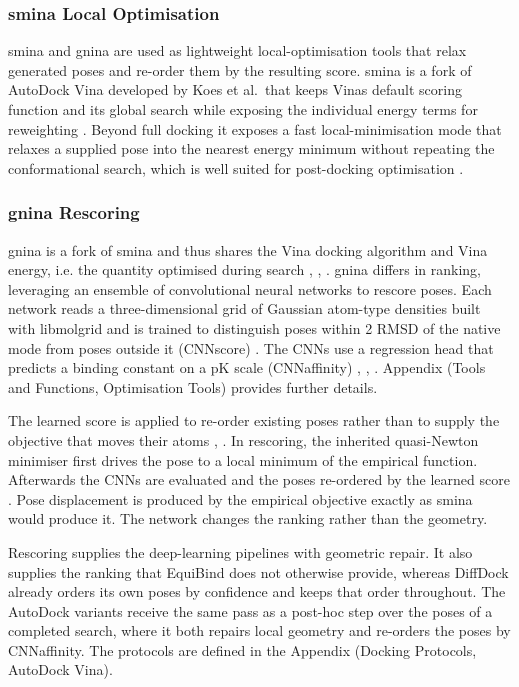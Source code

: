 \hypertarget{smina}{%
\subsubsection{smina Local Optimisation}\label{smina}}

smina and gnina are used as lightweight local-optimisation tools that relax generated poses and re-order them by the resulting score. smina is a fork of AutoDock Vina developed by Koes et al.\ that keeps Vina\textquotesingle s default scoring function and its global search while exposing the individual energy terms for reweighting \cite{ref055}. Beyond full docking it exposes a fast local-minimisation mode that relaxes a supplied pose into the nearest energy minimum without repeating the conformational search, which is well suited for post-docking optimisation \cite{ref057}.

\hypertarget{gnina}{%
\subsubsection{gnina Rescoring}\label{gnina}}

gnina is a fork of smina and thus shares the Vina docking algorithm and Vina energy, i.e. the quantity optimised during search \cite{ref056}, \cite{ref067}, \cite{ref068}. gnina differs in ranking, leveraging an ensemble of convolutional neural networks to rescore poses. Each network reads a three-dimensional grid of Gaussian atom-type densities built with libmolgrid \cite{ref076} and is trained to distinguish poses within 2\angstrom{} RMSD of the native mode from poses outside it (CNNscore) \cite{ref075}. The CNNs use a regression head that predicts a binding constant on a pK scale (CNNaffinity) \cite{ref059}, \cite{ref056}, \cite{ref067}. Appendix (Tools and Functions, Optimisation Tools) provides further details.

The learned score is applied to re-order existing poses rather than to supply the objective that moves their atoms \cite{ref056}, \cite{ref058}. In rescoring, the inherited quasi-Newton minimiser first drives the pose to a local minimum of the empirical function. Afterwards the CNNs are evaluated and the poses re-ordered by the learned score \cite{ref056}. Pose displacement is produced by the empirical objective exactly as smina would produce it. The network changes the ranking rather than the geometry.

Rescoring supplies the deep-learning pipelines with geometric repair. It also supplies the ranking that EquiBind does not otherwise provide, whereas DiffDock already orders its own poses by confidence and keeps that order throughout. The AutoDock variants receive the same pass as a post-hoc step over the poses of a completed search, where it both repairs local geometry and re-orders the poses by CNNaffinity. The protocols are defined in the Appendix (Docking Protocols, AutoDock Vina).

